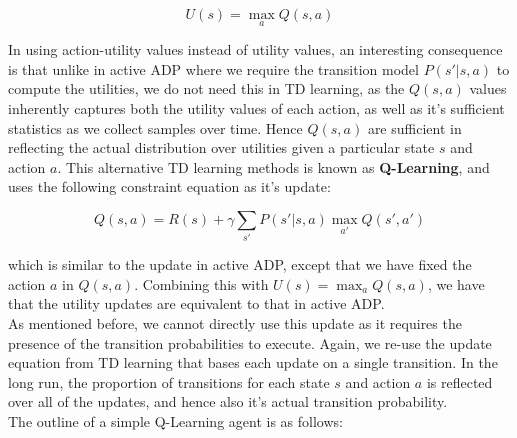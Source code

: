 \documentclass[11pt]{article}
\begin{document}
$$
U(s) = \max_a Q(s, a)
$$

In using action-utility values instead of utility values, an interesting consequence is that unlike in active ADP where we require the transition model $P(s' | s, a)$ to compute the utilities, we do not need this in TD learning, as the $Q(s, a)$ values inherently captures both the utility values of each action, as well as it's sufficient statistics as we collect samples over time. Hence $Q(s, a)$ are sufficient in reflecting the actual distribution over utilities given a particular state $s$ and action $a$. This alternative TD learning methods is known as \textbf{Q-Learning}, and uses the following constraint equation as it's update:

$$
Q(s, a) = R(s) + \gamma \sum_{s'} P(s' | s, a) \max_{a'} Q(s', a')
$$

which is similar to the update in active ADP, except that we have fixed the action $a$ in $Q(s, a)$. Combining this with $U(s) = \max_a Q(s, a)$, we have that the utility updates are equivalent to that in active ADP.\\

As mentioned before, we cannot directly use this update as it requires the presence of the transition probabilities to execute. Again, we re-use the update equation from TD learning that bases each update on a single transition. In the long run, the proportion of transitions for each state $s$ and action $a$ is reflected over all of the updates, and hence also it's actual transition probability.\\

The outline of a simple Q-Learning agent is as follows:
\end{document}
